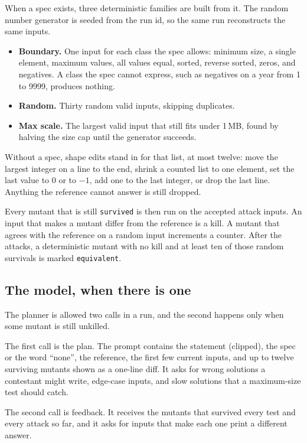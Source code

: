 \documentclass[10pt,a4paper]{article}
\begin{document}
When a spec exists, three deterministic families are built from it. The random number generator is seeded from the run id, so the same run reconstructs the same inputs.

\begin{itemize}
  \item \textbf{Boundary.} One input for each class the spec allows: minimum size, a single element, maximum values, all values equal, sorted, reverse sorted, zeros, and negatives. A class the spec cannot express, such as negatives on a year from 1 to 9999, produces nothing.
  \item \textbf{Random.} Thirty random valid inputs, skipping duplicates.
  \item \textbf{Max scale.} The largest valid input that still fits under 1\,MB, found by halving the size cap until the generator succeeds.
\end{itemize}

Without a spec, shape edits stand in for that list, at most twelve: move the largest integer on a line to the end, shrink a counted list to one element, set the last value to 0 or to $-1$, add one to the last integer, or drop the last line. Anything the reference cannot answer is still dropped.

Every mutant that is still \texttt{survived} is then run on the accepted attack inputs. An input that makes a mutant differ from the reference is a kill. A mutant that agrees with the reference on a random input increments a counter. After the attacks, a deterministic mutant with no kill and at least ten of those random survivals is marked \texttt{equivalent}.

\subsection{The model, when there is one}

The planner is allowed two calls in a run, and the second happens only when some mutant is still unkilled.

The first call is the plan. The prompt contains the statement (clipped), the spec or the word ``none'', the reference, the first few current inputs, and up to twelve surviving mutants shown as a one-line diff. It asks for wrong solutions a contestant might write, edge-case inputs, and slow solutions that a maximum-size test should catch.

The second call is feedback. It receives the mutants that survived every test and every attack so far, and it asks for inputs that make each one print a different answer.
\end{document}
